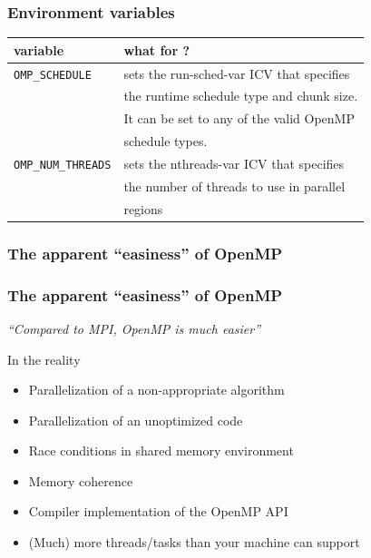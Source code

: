 \begin{frame}
\frametitle{Environment variables}

\begin{center}
\begin{tabular}{|l|l|}
\hline
  \textbf{variable} & \textbf{what for ?}  \\
\hline
\hline
\texttt{OMP\_SCHEDULE}
& sets the run-sched-var ICV that specifies \\
& the runtime schedule type and chunk size. \\
& It can be set to any of the valid OpenMP \\
& schedule types. \\
\hline

\texttt{OMP\_NUM\_THREADS}
& sets the nthreads-var ICV that specifies \\
& the number of threads to use in parallel  \\
& regions \\
\hline

\hline
\end{tabular}
\end{center}

\end{frame}

\subsubsection{The apparent ``easiness'' of OpenMP}

\begin{frame}
\frametitle{The apparent ``easiness'' of OpenMP}

\begin{block}{}
\textit{``Compared to MPI, OpenMP is much easier''}
\end{block}

\begin{exampleblock}{In the reality}
\begin{itemize}
\item{Parallelization of a non-appropriate algorithm}
\item{Parallelization of an unoptimized code}
\item{Race conditions in shared memory environment}
\item{Memory coherence}
\item{Compiler implementation of the OpenMP API}
\item{(Much) more threads/tasks than your machine can support}
\end{itemize}
\end{exampleblock}

\end{frame}


